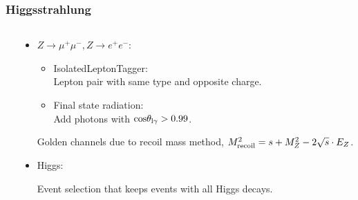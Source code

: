 \begin{frame}
    \frametitle{Higgsstrahlung}
    \begin{columns}[c,onlytextwidth]
    \begin{column}{0.38\textwidth}
    \resizebox{\textwidth}{!}{\FeynmanHiggsstrahlung}
    \end{column}
    \begin{column}{0.62\textwidth}
    \begin{itemize}
        \item \textcolor{xemphcolor}{
            $Z \rightarrow \mu^+ \mu^-, Z \rightarrow e^+ e^-$}:


            \begin{itemize}
                \item IsolatedLeptonTagger: \\
                    Lepton pair with same type and opposite charge.
                \item Final state radiation: \\
                    Add photons with $\mathrm{cos}\theta_{\mathrm{l\gamma}} > 0.99$.
            \end{itemize}
            Golden channels due to recoil mass method,
            $M_{\textnormal{recoil}}^2 = s + M_Z^2 - 2\sqrt{s} \cdot E_Z$.
        \item \textcolor{xemphcolor}{Higgs}:

            Event selection that keeps events with all Higgs decays.
    \end{itemize}
    \end{column}
    \end{columns}
    \end{frame}
